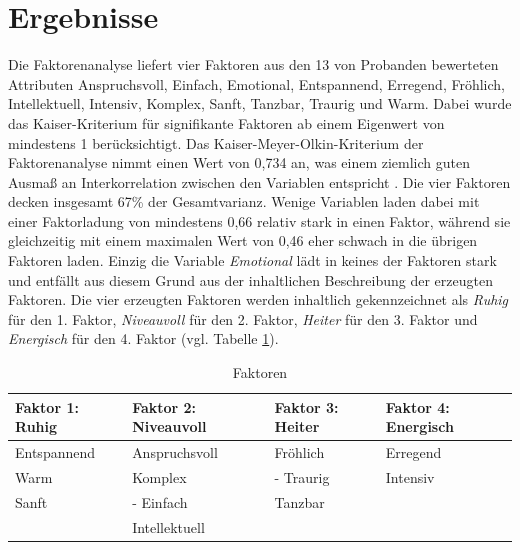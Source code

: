 \section*{Ergebnisse}
\label{sec:Ergebnisse}

Die Faktorenanalyse liefert vier Faktoren aus den 13 von Probanden bewerteten Attributen Anspruchsvoll, Einfach, Emotional, Entspannend, Erregend, Fröhlich, Intellektuell, Intensiv, Komplex, Sanft, Tanzbar, Traurig und Warm. 
Dabei wurde das Kaiser-Kriterium für signifikante Faktoren ab einem Eigenwert von mindestens 1 berücksichtigt.
Das Kaiser-Meyer-Olkin-Kriterium der Faktorenanalyse nimmt einen Wert von 0,734 an, was einem ziemlich guten Ausmaß an Interkorrelation zwischen den Variablen entspricht \cite{eckey2002multivariate}.
Die vier Faktoren decken insgesamt 67\% der Gesamtvarianz.
Wenige Variablen laden dabei mit einer Faktorladung von mindestens 0,66 relativ stark in einen Faktor, während sie gleichzeitig mit einem maximalen Wert von 0,46 eher schwach in die übrigen Faktoren laden.
Einzig die Variable \textit{Emotional} lädt in keines der Faktoren stark und entfällt aus diesem Grund aus der inhaltlichen Beschreibung der erzeugten Faktoren.
Die vier erzeugten Faktoren werden inhaltlich gekennzeichnet als \textit{Ruhig} für den 1. Faktor, \textit{Niveauvoll} für den 2. Faktor, \textit{Heiter} für den 3. Faktor und \textit{Energisch} für den 4. Faktor (vgl. Tabelle \ref{tab:faktoren}).   


\begin{table}[htbp]
    \centering
    \caption{Faktoren}
    \vspace{2mm}
    \label{tab:faktoren}
        \begin{tabularx}{8cm}{|X|X|X|X|}
            \hline Faktor 1: \textbf{Ruhig} & Faktor 2: \textbf{Niveauvoll} & Faktor 3: \textbf{Heiter} & Faktor 4: \textbf{Energisch} \\
            \hline Entspan\-nend & Anspruchs\-voll       & Fröhlich             & Erregend \\
            \hline Warm              & Komplex                  & - Traurig            & Intensiv \\
            \hline Sanft               & - Einfach                 & Tanzbar             & \\
            \hline                        & Intellek\-tuell          &                          & \\
            \hline
        \end{tabularx}
\end{table}

